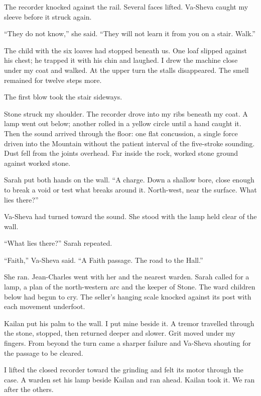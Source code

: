 The recorder knocked against the rail. Several faces lifted. Va-Sheva caught my sleeve before it struck again.\par

``They do not know,'' she said. ``They will not learn it from you on a stair. Walk.''\par

The child with the six loaves had stopped beneath us. One loaf slipped against his chest; he trapped it with his chin and laughed. I drew the machine close under my coat and walked. At the upper turn the stalls disappeared. The smell remained for twelve steps more.\par

\ornament

The first blow took the stair sideways.\par

Stone struck my shoulder. The recorder drove into my ribs beneath my coat. A lamp went out below; another rolled in a yellow circle until a hand caught it. Then the sound arrived through the floor: one flat concussion, a single force driven into the Mountain without the patient interval of the five-stroke sounding. Dust fell from the joints overhead. Far inside the rock, worked stone ground against worked stone.\par

Sarah put both hands on the wall. ``A charge. Down a shallow bore, close enough to break a void or test what breaks around it. North-west, near the surface. What lies there?''\par

Va-Sheva had turned toward the sound. She stood with the lamp held clear of the wall.\par

``What lies there?'' Sarah repeated.\par

``Faith,'' Va-Sheva said. ``A Faith passage. The road to the Hall.''\par

She ran. Jean-Charles went with her and the nearest warden. Sarah called for a lamp, a plan of the north-western arc and the keeper of Stone. The ward children below had begun to cry. The seller's hanging scale knocked against its post with each movement underfoot.\par

Kailan put his palm to the wall. I put mine beside it. A tremor travelled through the stone, stopped, then returned deeper and slower. Grit moved under my fingers. From beyond the turn came a sharper failure and Va-Sheva shouting for the passage to be cleared.\par

I lifted the closed recorder toward the grinding and felt its motor through the case. A warden set his lamp beside Kailan and ran ahead. Kailan took it. We ran after the others.\par
